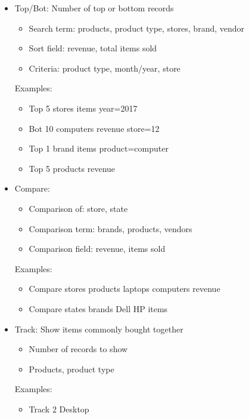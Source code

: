 \documentclass{article}
\begin{document}
\begin{itemize}
      \item
        Top/Bot: Number of top or bottom records
        \begin{itemize}
          \item Search term: products, product type, stores, brand, vendor
          \item Sort field: revenue, total items sold
          \item Criteria: product type, month/year, store
        \end{itemize}
        Examples:
        \begin{itemize}
          \item Top 5 stores items year=2017
          \item Bot 10 computers revenue store=12
          \item Top 1 brand items product=computer
          \item Top 5 products revenue
        \end{itemize}

      \item
        Compare:
        \begin{itemize}
          \item Comparison of: store, state
          \item Comparison term: brands, products, vendors
          \item Comparison field: revenue, items sold
        \end{itemize}
        Examples:
        \begin{itemize}
          \item Compare stores products laptops computers revenue 
          \item Compare states brands Dell HP items
        \end{itemize}

      \item
        Track: Show items commonly bought together
        \begin{itemize}
          \item Number of records to show
          \item Products, product type
        \end{itemize}
        Examples:
        \begin{itemize}
          \item Track 2 Desktop
        \end{itemize}
    \end{itemize}
\end{document}
